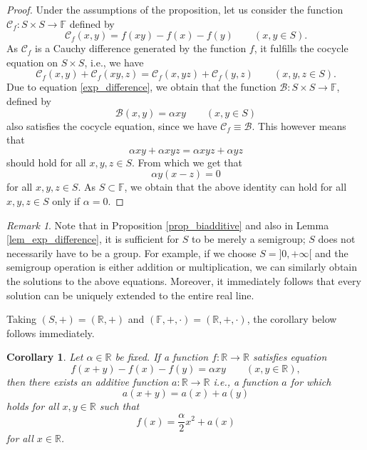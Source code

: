 \documentclass[a4paper,12pt]{article}
\theoremstyle{plain}
\newtheorem{cor}{Corollary}
\theoremstyle{definition}
\theoremstyle{remark}
\newtheorem*{rem}{Remark}
\begin{document}
\begin{proof}
 Under the assumptions of the proposition, let us consider the function $\mathscr{C}_{f}\colon S\times S\to \mathbb{F}$ defined by 
 \[
\mathscr{C}_{f}(x, y)= f(xy)-f(x)-f(y)  
\qquad 
\left(x, y\in S\right). 
 \]
 As $\mathscr{C}_{f}$ is a Cauchy difference generated by the function $f$, it fulfills the cocycle equation on $S\times S$, i.e., we have 
 \[
  \mathscr{C}_{f}(x, y)+\mathscr{C}_{f}(xy, z)= \mathscr{C}_{f}(x, yz)+\mathscr{C}_{f}(y, z) 
  \qquad 
  \left(x, y, z\in S\right). 
 \]
Due to equation \eqref{exp_difference}, we obtain that the function $\mathscr{B}\colon S\times S\to \mathbb{F}$, defined by 
\[
 \mathscr{B}(x, y)= \alpha xy 
 \qquad 
 \left(x, y\in S\right)
\]
also satisfies the cocycle equation, since we have $\mathscr{C}_{f}\equiv \mathscr{B}$. This however means that 
\[
 \alpha xy+\alpha xyz= \alpha xyz+\alpha yz
\]
should hold for all $x, y, z\in S$. From which we get that 
\[
 \alpha y (x-z)=0 
\]
for all $x, y, z\in S$. As $S \subset \mathbb{F}$, we obtain that the above identity can hold for all $x, y, z \in S$ only if $\alpha=0$. 
\end{proof}

\begin{rem}
 Note that in Proposition \ref{prop_biadditive} and also in Lemma \ref{lem_exp_difference}, it is sufficient for 
$S$ to be merely a semigroup; $S$ does not necessarily have to be a group. For example, if we choose $S=]0, +\infty[$ and the semigroup operation is either addition or multiplication, we can similarly obtain the solutions to the above equations. Moreover, it immediately follows that every solution can be uniquely extended to the entire real line.
\end{rem}



Taking $(S, +)= (\mathbb{R}, +)$ and $(\mathbb{F},+, \cdot)= (\mathbb{R},+, \cdot )$, the corollary below follows immediately. 

\begin{cor}\label{cor_add}
 Let $\alpha\in \mathbb{R}$ be fixed. If a function $f\colon \mathbb{R}\to \mathbb{R}$ satisfies equation 
 \begin{equation}\label{eq_add}
  f(x+y)-f(x)-f(y)= \alpha xy
  \qquad 
  (x, y \in \mathbb{R}), 
 \end{equation}
 then there exists an additive function $a\colon \mathbb{R}\to \mathbb{R}$ i.e., a function $a$ for which 
\[
 a(x+y)= a(x)+a(y)
\]
holds for all $x, y\in \mathbb{R}$ such that 
\[
 f(x)= \frac{\alpha}{2}x^{2}+a(x) 
\]
for all $x\in \mathbb{R}$. 
\end{cor}
\end{document}
